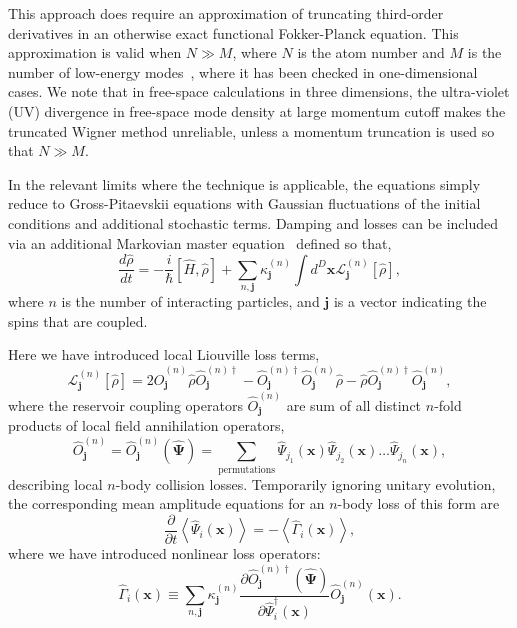 \documentclass[aps,prl,twocolumn,showpacs,amsmath,amssymb,superscriptaddress]{revtex4-1}
\newcommand{\xvec}{\boldsymbol{x}}
\newcommand{\jvec}{\boldsymbol{j}}
\newcommand{\Psivec}{\boldsymbol{\Psi}}
\begin{document}
This approach does require an approximation of truncating third-order derivatives
in an otherwise exact functional Fokker-Planck equation.
This approximation is valid when $N \gg M$, where $N$ is the atom number and
$M$ is the number of low-energy modes~\cite{Drummond1993,Sinatra2002,Norrie2006},
where it has been checked in one-dimensional cases.
We note that in free-space calculations in three dimensions,
the ultra-violet (UV) divergence in free-space mode density at large momentum cutoff
makes the truncated Wigner method unreliable,
unless a momentum truncation is used so that $N \gg M$.

In the relevant limits where the technique is applicable,
the equations simply reduce to Gross-Pitaevskii equations with Gaussian fluctuations
of the initial conditions and additional stochastic terms.
Damping and losses can be included via an additional Markovian master equation~\cite{Jack2002}
defined so that,
\begin{equation}
	\frac{d\hat{\rho}}{dt} = -\frac{i}{\hbar} \left[ \hat{H}, \hat{\rho} \right] +
	\sum_{n,\jvec} \kappa_{\jvec}^{(n)}
	\int d^D\xvec \mathcal{L}_{\jvec}^{(n)} \left[ \hat{\rho} \right],
\end{equation}
where $n$ is the number of interacting particles,
and $\jvec$ is a vector indicating the spins that are coupled.

Here we have introduced local Liouville loss terms,
\begin{equation}
	\mathcal{L}_{\jvec}^{(n)} \left[ \hat{\rho}\right] =
	2 \hat{O}_{\jvec}^{(n)} \hat{\rho}\hat{O}_{\jvec}^{(n)\dagger} -
	\hat{O}_{\jvec}^{(n)\dagger}\hat{O}_{\jvec}^{(n)}\hat{\rho} -
	\hat{\rho}\hat{O}_{\jvec}^{(n)\dagger}\hat{O}_{\jvec}^{(n)},
\end{equation}
where the reservoir coupling operators $\hat{O}_{\jvec}^{(n)}$
are sum of all distinct $n$-fold products of local field annihilation operators,
\begin{equation}
	\hat{O}_{\jvec}^{(n)} =
	\hat{O}_{\jvec}^{(n)} \left( \widehat{\Psivec} \right) =
	\sum_{\mathrm{permutations}}
	\widehat{\Psi}_{j_{1}} \left( \xvec \right)
	\widehat{\Psi}_{j_{2}} \left( \xvec \right) \ldots
	\widehat{\Psi}_{j_{n}} \left( \xvec \right),
\end{equation}
describing local $n$-body collision losses.
Temporarily ignoring unitary evolution, the corresponding mean amplitude equations
for an $n$-body loss of this form are
\begin{equation}
	\frac{\partial}{\partial t} \left\langle
		\widehat{\Psi}_{i} \left( \xvec \right)
	\right\rangle =
	-\left\langle \hat{\Gamma}_{i} \left( \xvec \right) \right\rangle ,
\end{equation}
where we have introduced  nonlinear loss operators:
\begin{equation}
	\hat{\Gamma}_{i} \left( \xvec \right) \equiv
	\sum_{n,\jvec} \kappa_{\jvec}^{(n)}
	\frac{\partial\hat{O}_{\jvec}^{(n)\dagger}	\left( \widehat{\Psivec} \right)}
		{\partial \hat{\Psi}_{i}^{\dagger} \left( \xvec \right)}
	\hat{O}_{\jvec}^{(n)} \left( \xvec \right) .
\end{equation}
\end{document}
